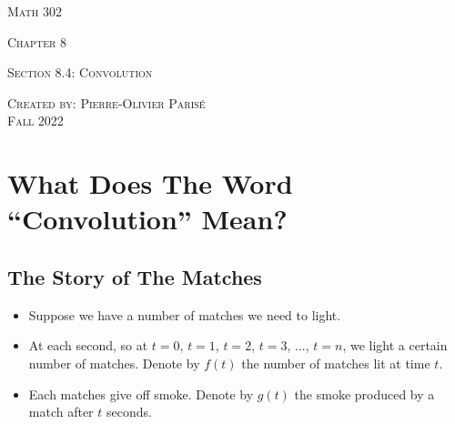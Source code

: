 \documentclass[12pt,a4paper]{article}
\begin{document}
\thispagestyle{empty}

\begin{center}
\vspace*{2.5cm}

{\Huge \textsc{Math 302}}

\vspace*{2cm}

{\LARGE \textsc{Chapter 8}} 

\vspace*{0.75cm}

\noindent\textsc{Section 8.4: Convolution}

\vspace*{0.75cm}

\tableofcontents

\vfill

\noindent \textsc{Created by: Pierre-Olivier Paris{\'e}} \\
\textsc{Fall 2022}
\end{center}

\newpage

\section{What Does The Word ``Convolution'' Mean?}

\subsection{The Story of The Matches}

	\begin{itemize}
	\item Suppose we have a number of matches we need to light.
	\item At each second, so at $t = 0$, $t = 1$, $t = 2$, $t = 3$, $...$, $t = n$, we light a certain number of matches. Denote by $f(t)$ the number of matches lit at time $t$.
	\item Each matches give off smoke. Denote by $g(t)$ the smoke produced by a match after $t$ seconds.
	\end{itemize}
	
\end{document}
